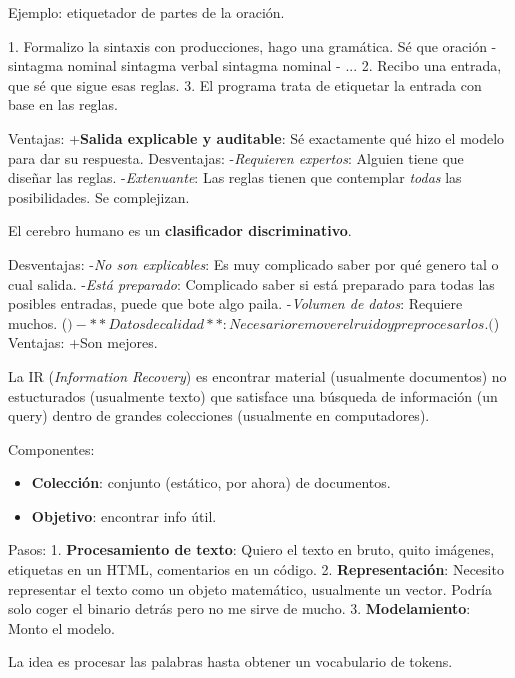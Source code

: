 \documentclass{fmbnotes}
\begin{document}
Ejemplo: etiquetador de partes de la oración.

1. Formalizo la sintaxis con producciones, hago una gramática.
	Sé que 
	oración -  sintagma nominal  sintagma verbal
	sintagma nominal - ...
2. Recibo una entrada, que sé que sigue esas reglas.
3. El programa trata de etiquetar la entrada con base en las reglas.

Ventajas:
+\textbf{Salida explicable y auditable}: Sé exactamente qué hizo el modelo para dar su respuesta.
Desventajas:
-\textit{Requieren expertos}: Alguien tiene que diseñar las reglas.
-\textit{Extenuante}: Las reglas tienen que contemplar \textit{todas} las posibilidades. Se complejizan.

\label{sec:enfoque_basado_en_datos_machine_learning}

El cerebro humano es un \textbf{clasificador discriminativo}.

Desventajas:
-\textit{No son explicables}: Es muy complicado saber por qué genero tal o cual salida.
-\textit{Está preparado}: Complicado saber si está preparado para todas las posibles entradas, puede que bote algo paila.
-\textit{Volumen de datos}: Requiere muchos. (\()
-**Datos de calidad**: Necesario remover el ruido y preprocesarlos. (\))
Ventajas:
+Son mejores.


\label{sec:recuperacion_de_informacion}
La IR (\textit{Information Recovery}) es encontrar material (usualmente documentos) no estucturados (usualmente texto) que satisface una búsqueda de información (un query) dentro de grandes colecciones (usualmente en computadores).

Componentes:

\begin{itemize}
    \item \textbf{Colección}: conjunto (estático, por ahora) de documentos.
    \item \textbf{Objetivo}: encontrar info útil.
\end{itemize}

Pasos:
1. \textbf{Procesamiento de texto}: Quiero el texto en bruto, quito imágenes, etiquetas en un HTML, comentarios en un código.
2. \textbf{Representación}: Necesito representar el texto como un objeto matemático, usualmente un vector. Podría solo coger el binario detrás pero no me sirve de mucho.
3. \textbf{Modelamiento}: Monto el modelo.

\label{sec:procesamiento_de_texto}
La idea es procesar las palabras hasta obtener un vocabulario de tokens.
\end{document}
